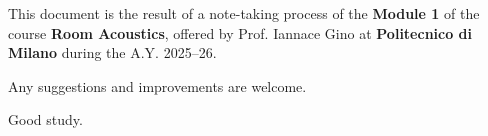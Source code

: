 \setcounter{page}{0}
\thispagestyle{nohead}

\vspace*{\fill}
\begin{center}
This document is the result of a note-taking process of the \textbf{Module 1} of the course \textbf{Room Acoustics}, offered by Prof. Iannace Gino at \textbf{Politecnico di Milano} during the A.Y. 2025--26.

Any suggestions and improvements are welcome.

Good study.
\end{center}
\vspace*{\fill}

\clearpage
